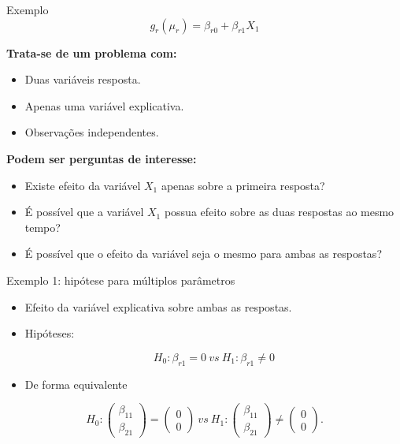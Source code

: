 \documentclass[
  ignorenonframetext,
  serif,
  professionalfont,
  usenames,
  dvipsnames,
  aspectratio = 169]{beamer}
\def\endColumns{\end{minipage}}%
\def\beginAHalfColumnT{\begin{minipage}[t]{0.49\textwidth}}%
\begin{document}
\begin{frame}{Exemplo}
\protect\hypertarget{exemplo-1}{}
\[
g_r(\mu_r) = \beta_{r0} + \beta_{r1} X_1
\]

\beginAHalfColumnT

\textbf{Trata-se de um problema com:}

\begin{itemize}
  \itemsep 1ex
  \item Duas variáveis resposta.
  \item Apenas uma variável explicativa.
  \item Observações independentes.
\end{itemize}

\endColumns
\beginAHalfColumnT

\textbf{Podem ser perguntas de interesse:}

\begin{itemize}
  \itemsep 1ex
  \item Existe efeito da variável $X_1$ apenas sobre a primeira resposta?
  \item É possível que a variável $X_1$ possua efeito sobre as duas respostas ao mesmo tempo?
  \item É possível que o efeito da variável seja o mesmo para ambas as respostas? 
\end{itemize}

\endColumns
\end{frame}

\begin{frame}{Exemplo 1: hipótese para múltiplos parâmetros}
\protect\hypertarget{exemplo-1-hipuxf3tese-para-muxfaltiplos-paruxe2metros}{}
\begin{itemize}
  \itemsep 2ex
  
  \item Efeito da variável explicativa sobre ambas as respostas.
  
  \item Hipóteses: 
  
$$H_0: \beta_{r1} = 0 \ vs \ H_1: \beta_{r1} \neq 0$$  

  \item De forma equivalente

\end{itemize}

\[
H_0: 
\begin{pmatrix}
\beta_{11} \\ 
\beta_{21}
\end{pmatrix} 
= 
\begin{pmatrix}
0 \\ 
0
\end{pmatrix}
\ vs \ 
H_1: 
\begin{pmatrix}
\beta_{11} \\ 
\beta_{21}
\end{pmatrix} 
\neq
\begin{pmatrix}
0 \\ 
0 
\end{pmatrix}.
\]
\end{frame}
\end{document}
